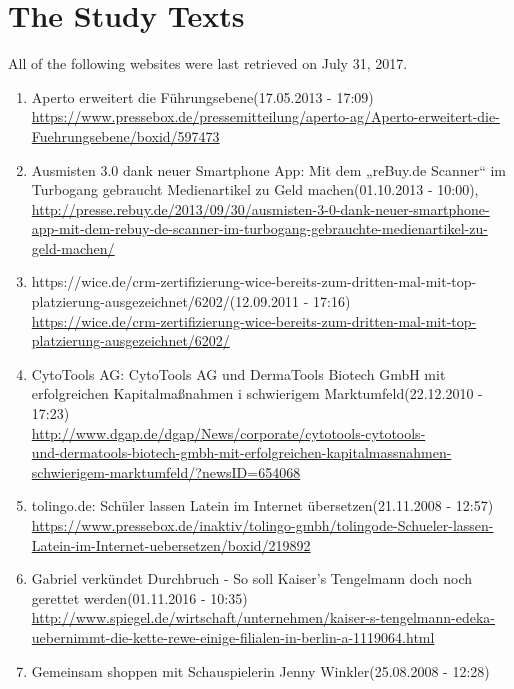 \section{The Study Texts}
  \label{appendixStudyTexts}
  All of the following websites were last retrieved on July 31, 2017.
  \begin{enumerate}
    \item \lqq Aperto erweitert die Führungsebene\rqq (17.05.2013 - 17:09) \\
    \url{https://www.pressebox.de/pressemitteilung/aperto-ag/Aperto-erweitert-die-Fuehrungsebene/boxid/597473}
    \item \lqq Ausmisten 3.0 dank neuer Smartphone App: Mit dem „reBuy.de Scanner“ im Turbogang gebraucht Medienartikel zu Geld machen\rqq (01.10.2013 - 10:00),\\
    \url{http://presse.rebuy.de/2013/09/30/ausmisten-3-0-dank-neuer-smartphone-app-mit-dem-rebuy-de-scanner-im-turbogang-gebrauchte-medienartikel-zu-geld-machen/}
    \item \lqq https://wice.de/crm-zertifizierung-wice-bereits-zum-dritten-mal-mit-top-platzierung-ausgezeichnet/6202/\rqq (12.09.2011 - 17:16) \\
    \url{https://wice.de/crm-zertifizierung-wice-bereits-zum-dritten-mal-mit-top-platzierung-ausgezeichnet/6202/}
    \item \lqq CytoTools AG: CytoTools AG und DermaTools Biotech GmbH mit erfolgreichen Kapitalmaßnahmen i schwierigem Marktumfeld\rqq (22.12.2010 - 17:23) \\
    \url{http://www.dgap.de/dgap/News/corporate/cytotools-cytotools-} \\
    \url{und-dermatools-biotech-gmbh-mit-erfolgreichen-kapitalmassnahmen-} \\
    \url{schwierigem-marktumfeld/?newsID=654068}
    \item \lqq tolingo.de: Schüler lassen Latein im Internet übersetzen\rqq (21.11.2008 - 12:57) \\
    \url{https://www.pressebox.de/inaktiv/tolingo-gmbh/tolingode-Schueler-lassen-Latein-im-Internet-uebersetzen/boxid/219892}
    \item \lqq Gabriel verkündet Durchbruch - So soll Kaiser's Tengelmann doch noch gerettet werden\rqq (01.11.2016 - 10:35) \\
    \url{http://www.spiegel.de/wirtschaft/unternehmen/kaiser-s-tengelmann-edeka-uebernimmt-die-kette-rewe-einige-filialen-in-berlin-a-1119064.html}
    \item \lqq Gemeinsam shoppen mit Schauspielerin Jenny Winkler\rqq (25.08.2008 - 12:28) \\

\end{enumerate}
